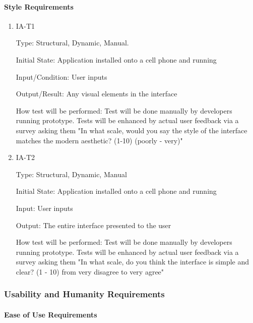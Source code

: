 \documentclass[12pt, titlepage]{article}
\begin{document}
\paragraph{Style Requirements}

\begin{enumerate}

\item{IA-T1\\}

Type: Structural, Dynamic, Manual.
					
Initial State: Application installed onto a cell phone and running
					
Input/Condition: User inputs
					
Output/Result: Any visual elements in the interface
					
How test will be performed: Test will be done manually by developers running prototype. Tests will be enhanced by actual user feedback via a survey asking them "In what scale, would you say the style of the interface matches the modern aesthetic? (1-10) (poorly - very)"
					
\item{IA-T2\\}

Type: Structural, Dynamic, Manual
					
Initial State: Application installed onto a cell phone and running
					
Input: User inputs
					
Output: The entire interface presented to the user
					
How test will be performed: Test will be done manually by developers running prototype. Tests will be enhanced by actual user feedback via a survey asking them "In what scale, do you think the interface is simple and clear? (1 - 10) from very disagree to very agree"

\end{enumerate}

\subsubsection{Usability and Humanity Requirements}
		
\paragraph{Ease of Use Requirements}
\end{document}
